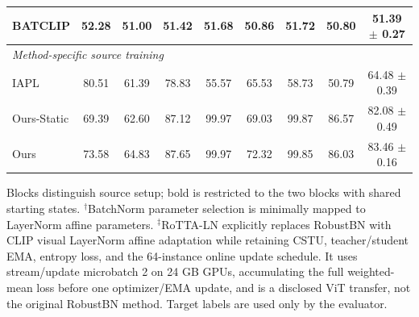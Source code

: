 \begin{table}[t]
{\begin{tabular}{lcccccccc}
BATCLIP & 52.28 & 51.00 & 51.42 & 51.68 & 50.86 & 51.72 & 50.80 & 51.39 $\pm$ 0.27 \\
\midrule
\multicolumn{9}{l}{\textit{Method-specific source training}} \\
IAPL & 80.51 & 61.39 & 78.83 & 55.57 & 65.53 & 58.73 & 50.79 & 64.48 $\pm$ 0.39 \\
Ours-Static & 69.39 & 62.60 & 87.12 & 99.97 & 69.03 & 99.87 & 86.57 & 82.08 $\pm$ 0.49 \\
Ours & 73.58 & 64.83 & 87.65 & 99.97 & 72.32 & 99.85 & 86.03 & 83.46 $\pm$ 0.16 \\
\bottomrule
\end{tabular}%
}
\vspace{2pt}
\parbox{\textwidth}{\footnotesize Blocks distinguish source setup; bold is restricted to the two blocks with shared starting states. $^{\dagger}$BatchNorm parameter selection is minimally mapped to LayerNorm affine parameters. $^{\ddagger}$RoTTA-LN explicitly replaces RobustBN with CLIP visual LayerNorm affine adaptation while retaining CSTU, teacher/student EMA, entropy loss, and the 64-instance online update schedule. It uses stream/update microbatch 2 on 24 GB GPUs, accumulating the full weighted-mean loss before one optimizer/EMA update, and is a disclosed ViT transfer, not the original RobustBN method. Target labels are used only by the evaluator.}
\end{table}
